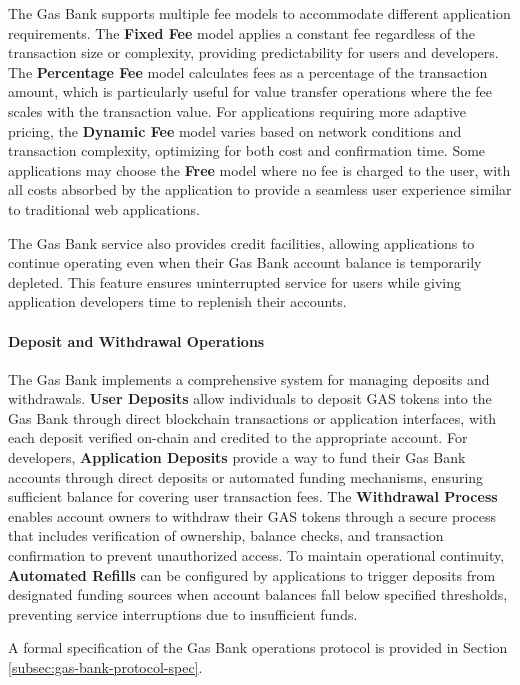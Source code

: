 \documentclass[11pt]{article}
\begin{document}
The Gas Bank supports multiple fee models to accommodate different application requirements. The \textbf{Fixed Fee} model applies a constant fee regardless of the transaction size or complexity, providing predictability for users and developers. The \textbf{Percentage Fee} model calculates fees as a percentage of the transaction amount, which is particularly useful for value transfer operations where the fee scales with the transaction value. For applications requiring more adaptive pricing, the \textbf{Dynamic Fee} model varies based on network conditions and transaction complexity, optimizing for both cost and confirmation time. Some applications may choose the \textbf{Free} model where no fee is charged to the user, with all costs absorbed by the application to provide a seamless user experience similar to traditional web applications.

The Gas Bank service also provides credit facilities, allowing applications to continue operating even when their Gas Bank account balance is temporarily depleted. This feature ensures uninterrupted service for users while giving application developers time to replenish their accounts.

\paragraph{Deposit and Withdrawal Operations}
The Gas Bank implements a comprehensive system for managing deposits and withdrawals. \textbf{User Deposits} allow individuals to deposit GAS tokens into the Gas Bank through direct blockchain transactions or application interfaces, with each deposit verified on-chain and credited to the appropriate account. For developers, \textbf{Application Deposits} provide a way to fund their Gas Bank accounts through direct deposits or automated funding mechanisms, ensuring sufficient balance for covering user transaction fees. The \textbf{Withdrawal Process} enables account owners to withdraw their GAS tokens through a secure process that includes verification of ownership, balance checks, and transaction confirmation to prevent unauthorized access. To maintain operational continuity, \textbf{Automated Refills} can be configured by applications to trigger deposits from designated funding sources when account balances fall below specified thresholds, preventing service interruptions due to insufficient funds.

A formal specification of the Gas Bank operations protocol is provided in Section \ref{subsec:gas-bank-protocol-spec}.
\end{document}
